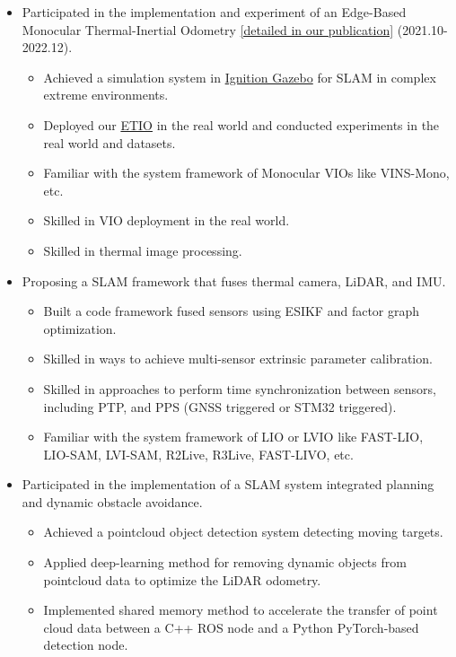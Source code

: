 \documentclass[11pt,a4paper]{moderncv}        %
\begin{document}
%
{
\begin{itemize}%
\item Participated in the implementation and experiment of an Edge-Based Monocular Thermal-Inertial Odometry \hyperref[sec:Publications]{[detailed in our publication]} (2021.10-2022.12).
\begin{itemize}%
\hypersetup{urlcolor=black}
\item Achieved a simulation system in \href{https://gazebosim.org/api/gazebo/2.10/index.html}{Ignition Gazebo} for SLAM in complex extreme environments.
\item Deployed our \hyperref[sec:Publications]{ETIO} in the real world and conducted experiments in the real world and datasets.
\item Familiar with the system framework of Monocular VIOs like VINS-Mono, etc.
\item Skilled in  VIO deployment in the real world.
\item Skilled in thermal image processing.
\end{itemize}
\item Proposing a SLAM framework that fuses thermal camera, LiDAR, and IMU.
\begin{itemize}%
\item Built a code framework fused sensors using ESIKF and factor graph optimization. 
\item Skilled in ways to achieve multi-sensor extrinsic parameter calibration.
\item Skilled in approaches to perform time synchronization between sensors, including PTP, and PPS (GNSS triggered or STM32 triggered).
\item Familiar with the system framework of LIO or LVIO like FAST-LIO, LIO-SAM, LVI-SAM, R2Live, R3Live, FAST-LIVO, etc.
\end{itemize}
\item Participated in the implementation of a SLAM system integrated planning and dynamic obstacle avoidance.  
\begin{itemize}%
\item Achieved a pointcloud object detection system detecting moving targets.
\item Applied deep-learning method for removing dynamic objects from pointcloud data to optimize the LiDAR odometry.
\item Implemented shared memory method to accelerate the transfer of point cloud data between a C++ ROS node and a Python PyTorch-based detection node.
\end{itemize}
\end{itemize}
}
\end{document}
